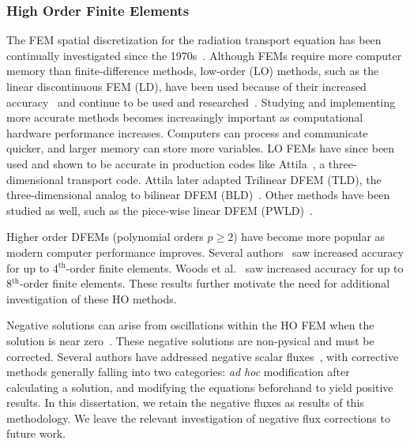 \documentclass{article}
\begin{document}
\subsubsection{High Order Finite Elements}
The FEM spatial discretization for the radiation transport equation has been continually investigated since the 1970s~\cite{ReedTriangularMesh, LasaintFEM}. Although FEMs require more computer memory than finite-difference methods, low-order (LO) methods, such as the linear discontinuous FEM (LD), have been used because of their increased accuracy~\cite{LarsenAsymptotic} and continue to be used and researched~\cite{LarsenConvergenceRates,HamiltonNegativeFluxFixups,Adams_Disc_FEM_Thick_Diff}. Studying and implementing more accurate methods becomes increasingly important as computational hardware performance increases. Computers can process and communicate quicker, and larger memory can store more variables. LO FEMs have since been used and shown to be accurate in production codes like Attila~\cite{WareingAttila}, a three-dimensional transport code. Attila later adapted Trilinear DFEM (TLD), the three-dimensional analog to bilinear DFEM (BLD)~\cite{AttilaUsersManual}. Other methods have been studied as well, such as the piece-wise linear DFEM (PWLD)~\cite{BaileyDFEMCylindrical}.

Higher order DFEMs (polynomial orders $p \geq 2$) have become more popular as modern computer performance improves. Several authors~\cite{WangRagusaDSA, WangHODGTransport, WangDGFEMConvergence, WangDissertation} saw increased accuracy for up to 4$^\text{th}$-order finite elements. Woods et al.~\cite{WoodsHoDgfemXyCurved} saw increased accuracy for up to 8$^\text{th}$-order finite elements. These results further motivate the need for additional investigation of these HO methods.

Negative solutions can arise from oscillations within the HO FEM when the solution is near zero~\cite{WoodsThesis,WoodsHoDgfemXyCurved}. These negative solutions are non-pysical and must be corrected. Several authors have addressed negative scalar fluxes~\cite{HamiltonNegativeFluxFixups, Adams_Disc_FEM_Thick_Diff, MaginotNonNegative, MaginotLumpingDFEM, BrunnerPreservingPositivity}, with corrective methods generally falling into two categories: \emph{ad hoc} modification after calculating a solution, and modifying the equations beforehand to yield positive results. In this dissertation, we retain the negative fluxes as results of this methodology. We leave the relevant investigation of negative flux corrections to future work.
\end{document}
